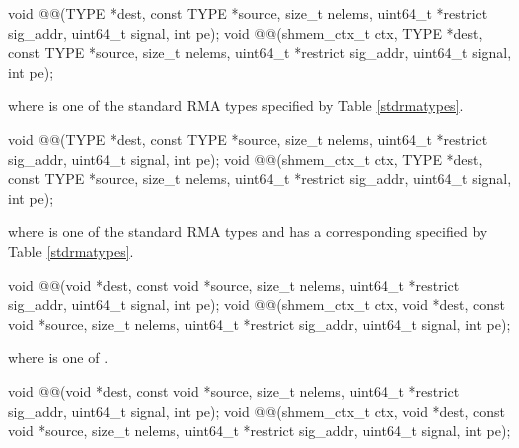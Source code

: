 
\begin{apidefinition}

\begin{C11synopsis}
void @@(TYPE *dest, const TYPE *source, size_t nelems, uint64_t *restrict sig_addr, uint64_t signal, int pe);
void @@(shmem_ctx_t ctx, TYPE *dest, const TYPE *source, size_t nelems, uint64_t *restrict sig_addr, uint64_t signal, int pe);
\end{C11synopsis}
where \TYPE{} is one of the standard \ac{RMA} types specified by Table \ref{stdrmatypes}.

\begin{Csynopsis}
void @@(TYPE *dest, const TYPE *source, size_t nelems, uint64_t *restrict sig_addr, uint64_t signal, int pe);
void @@(shmem_ctx_t ctx, TYPE *dest, const TYPE *source, size_t nelems, uint64_t *restrict sig_addr, uint64_t signal, int pe);
\end{Csynopsis}
where \TYPE{} is one of the standard \ac{RMA} types and has a corresponding \TYPENAME{} specified by Table \ref{stdrmatypes}.

\begin{CsynopsisCol}
void @@(void *dest, const void *source, size_t nelems, uint64_t *restrict sig_addr, uint64_t signal, int pe);
void @@(shmem_ctx_t ctx, void *dest, const void *source, size_t nelems, uint64_t *restrict sig_addr, uint64_t signal, int pe);
\end{CsynopsisCol}
where \SIZE{} is one of .

\begin{CsynopsisCol}
void @@(void *dest, const void *source, size_t nelems, uint64_t *restrict sig_addr, uint64_t signal, int pe);
void @@(shmem_ctx_t ctx, void *dest, const void *source, size_t nelems, uint64_t *restrict sig_addr, uint64_t signal, int pe);
\end{CsynopsisCol}


\end{apidefinition}
